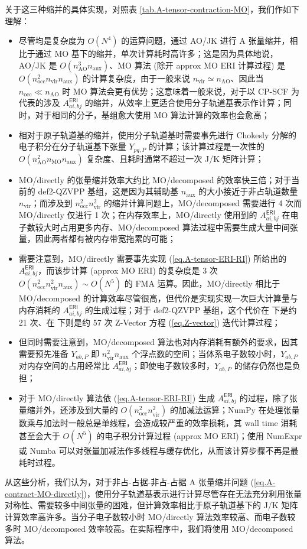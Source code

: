 关于这三种缩并的具体实现，对照表 \ref{tab.A-tensor-contraction-MO}，我们作如下理解：
\begin{itemize}[nosep]
  \item 尽管均是复杂度为 $O(N^4)$ 的运算问题，通过 AO/JK 进行 A 张量缩并，相比于通过 MO 基下的缩并，单次计算耗时高许多；这是因为具体地说，AO/JK 是 $O(n_\mathrm{AO}^3 n_\mathrm{aux})$、MO 算法 (除开 approx MO ERI 计算过程) 是 $O(n_\mathrm{occ}^2 n_\mathrm{vir} n_\mathrm{aux})$ 的计算复杂度，由于一般来说 $n_\mathrm{vir} \simeq n_\mathrm{AO}$、因此当 $n_\mathrm{occ} \ll n_\mathrm{AO}$ 时 MO 算法会更有优势；这意味着一般来说，对于以 CP-SCF 为代表的涉及 $A_{ai, bj}^\textsf{ERI}$ 的缩并，从效率上更适合使用分子轨道基表示作计算；同时，对于相同的分子，基组愈大使用 MO 算法计算的效率也会愈高；
  \item 相对于原子轨道基的缩并，使用分子轨道基时需要事先进行 Chokesly 分解的电子积分在分子轨道基下张量 $Y_{pq, P}$ 的计算；该计算过程是一次性的 $O(n_\mathrm{AO}^2 n_\mathrm{MO} n_\mathrm{aux})$ 复杂度、且耗时通常不超过一次 J/K 矩阵计算；
  \item MO/directly 的张量缩并效率大约比 MO/decomposed 的效率快三倍；对于当前的 def2-QZVPP 基组，这是因为其辅助基 $n_\mathrm{aux}$ 的大小接近于非占轨道数量 $n_\mathrm{vir}$；而涉及到 $n_\mathrm{occ}^2 n_\mathrm{vir}^2$ 的缩并计算问题上，MO/decomposed 需要进行 4 次而 MO/directly 仅进行 1 次；在内存效率上，MO/directly 使用到的 $A_{ai, bj}^\textsf{ERI}$ 在电子数较大时占用更多内存、MO/decomposed 算法过程中需要生成大量中间张量，因此两者都有被内存带宽拖累的可能；
  \item 需要注意到，MO/directly 需要事先实现 (\ref{eq.A-tensor-ERI-RI}) 所给出的 $A_{ai, bj}^\textsf{ERI}$，而该步计算 (approx MO ERI) 的复杂度是 3 次 $O(n_\mathrm{occ}^2 n_\mathrm{vir}^2 n_\mathrm{aux}) \sim O(N^5)$ 的 FMA 运算。因此，MO/directly 相比于 MO/decomposed 的计算效率尽管很高，但代价是实现实现一次巨大计算量与内存消耗的 $A_{ai, bj}^\textsf{ERI}$ 的生成过程；对于 def2-QZVPP 基组，这个代价在  下是约 21 次、在  下则是约 57 次 Z-Vector 方程 (\ref{eq.Z-vector}) 迭代计算过程；
  \item 但同时需要注意到，MO/decomposed 算法也对内存消耗有额外的要求，因其需要预先准备 $Y_{ab, P}$ 即 $n_\mathrm{vir}^2 n_\mathrm{aux}$ 个浮点数的空间；当体系电子数较小时，$Y_{ab, P}$ 对内存空间的占用经常比 $A_{ai, bj}^\textsf{ERI}$；即使电子数较多时，$Y_{ab, P}$ 的储存仍然也是负担；
  \item 对于 MO/directly 算法依 (\ref{eq.A-tensor-ERI-RI}) 生成 $A_{ai, bj}^\textsf{ERI}$ 的过程，除了张量缩并外，还涉及到大量的 $O(n_\mathrm{occ}^2 n_\mathrm{vir}^2)$ 的加减法运算；NumPy 在处理张量数乘与加法时一般总是单线程，会造成较严重的效率损耗，其 wall time 消耗甚至会大于 $O(N^5)$ 的电子积分计算过程 (approx MO ERI)；使用 NumExpr 或 Numba 可以对张量加减法作多线程与缓存优化，从而该计算步骤不再是最耗时过程。
\end{itemize}
从这些分析，我们认为，对于非占-占据-非占-占据 A 张量缩并问题 (\ref{eq.A-contract-MO-directly})，使用分子轨道基表示进行计算尽管存在无法充分利用张量对称性、需要较多中间张量的困难，但计算效率相比于原子轨道基下的 J/K 矩阵计算效率高许多。当分子电子数较小时 MO/directly 算法效率较高、而电子数较多时 MO/decomposed 效率较高。在实际程序中，\alert{我们将使用 MO/decomposed 算法}。

